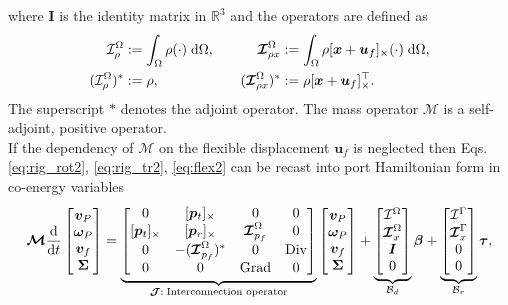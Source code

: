 \documentclass{svjour3}                     %
\DeclareMathOperator*{\Grad}{Grad}
\DeclareMathOperator*{\Div}{Div}
\newcommand{\crmat}[1]{\ensuremath{[#1]_{\times}}}
\begin{document}
where $\bm{I}$ is the identity matrix in $\mathbb{R}^3$ and the operators are defined as
\begin{equation*}
\begin{aligned}
\mathcal{I}_\rho^\Omega &:=\int_{\Omega} \rho (\cdot) \d{\Omega}, \\
(\mathcal{I}_\rho^{\Omega})^* &:= \rho, \\
\end{aligned} \qquad
\begin{aligned} 
\bm{\mathcal{I}}_{\rho x}^{\Omega} &:= \int_\Omega \rho \crmat{\bm{x}+\bm{u}_f} (\cdot) \d{\Omega}, \\
(\bm{\mathcal{I}}_{\rho x}^{\Omega})^* &:= \rho \crmat{\bm{x}+\bm{u}_f}^\top. \\
\end{aligned}
\end{equation*}
The superscript $*$ denotes the adjoint operator. The mass operator $\bm{\mathcal{M}}$ is a self-adjoint, positive operator. \\
If the dependency of $\bm{\mathcal{M}}$ on the flexible displacement $\bm{u}_f$ is neglected then Eqs. \eqref{eq:rig_rot2}, \eqref{eq:rig_tr2}, \eqref{eq:flex2} can be recast into port Hamiltonian form in co-energy variables
\begin{equation}
\label{eq:ph_mfd}
\bm{\mathcal{M}}
\diff{}{t}
\begin{bmatrix}
\bm{v}_P \\ \bm{\omega}_P  \\ \bm{v}_f  \\ \bm\Sigma \\
\end{bmatrix} = 
\underbrace{\begin{bmatrix}
0 & \crmat{\bm{p}_t} & 0 & 0 \\
\crmat{\bm{p}_t} & \crmat{\bm{p}_r} & \bm{\mathcal{I}}_{p_f}^\Omega & 0 \\
0 & -(\bm{\mathcal{I}}_{p_f}^\Omega)^* & 0 & \Div \\
0 & 0 & \Grad & 0 \\
\end{bmatrix}}_{\bm{\mathcal{J}}: \; \text{Interconnection operator}}
\begin{bmatrix}
\bm{v}_P \\ \bm{\omega}_P  \\ \bm{v}_f  \\ \bm\Sigma \\
\end{bmatrix} + 
\underbrace{\begin{bmatrix}
\mathcal{I}^\Omega \\
\bm{\mathcal{I}}_{x}^\Omega \\
\bm{I} \\
0 \\
\end{bmatrix}}_{\mathcal{B}_d}
\bm\beta + 
\underbrace{\begin{bmatrix}
\mathcal{I}^\Gamma \\
\bm{\mathcal{I}}_{x}^\Gamma \\
0 \\
0 \\
\end{bmatrix}}_{\mathcal{B}_r} \bm\tau,
\end{equation}
\end{document}
